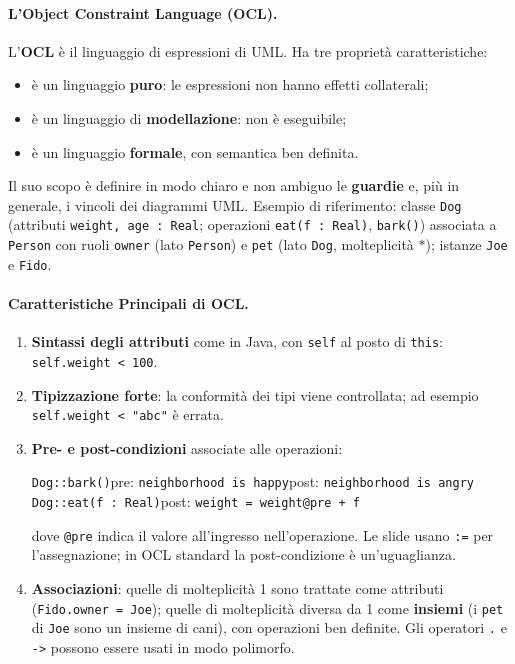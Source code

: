 \documentclass[12pt]{extarticle}
\begin{document}
\paragraph{L'Object Constraint Language (OCL).}
L'\textbf{OCL} è il linguaggio di espressioni di UML. Ha tre proprietà caratteristiche:
\begin{itemize}
    \item è un linguaggio \textbf{puro}: le espressioni non hanno effetti collaterali;
    \item è un linguaggio di \textbf{modellazione}: non è eseguibile;
    \item è un linguaggio \textbf{formale}, con semantica ben definita.
\end{itemize}
Il suo scopo è definire in modo chiaro e non ambiguo le \textbf{guardie} e, più in generale, i vincoli dei diagrammi UML. Esempio di riferimento: classe \texttt{Dog} (attributi \texttt{weight, age : Real}; operazioni \texttt{eat(f : Real)}, \texttt{bark()}) associata a \texttt{Person} con ruoli \texttt{owner} (lato \texttt{Person}) e \texttt{pet} (lato \texttt{Dog}, molteplicità $*$); istanze \texttt{Joe} e \texttt{Fido}.

\paragraph{Caratteristiche Principali di OCL.}
\begin{enumerate}
    \item \textbf{Sintassi degli attributi} come in Java, con \texttt{self} al posto di \texttt{this}: \texttt{self.weight < 100}.
    \item \textbf{Tipizzazione forte}: la conformità dei tipi viene controllata; ad esempio \texttt{self.weight < "abc"} è errata.
    \item \textbf{Pre- e post-condizioni} associate alle operazioni:
    \begin{center}
    \texttt{Dog::bark()}\quad pre: \texttt{neighborhood is happy}\quad post: \texttt{neighborhood is angry}\\[2pt]
    \texttt{Dog::eat(f : Real)}\quad post: \texttt{weight = weight@pre + f}
    \end{center}
    dove \texttt{@pre} indica il valore all'ingresso nell'operazione. Le slide usano \texttt{:=} per l'assegnazione; in OCL standard la post-condizione è un'uguaglianza.
    \item \textbf{Associazioni}: quelle di molteplicità 1 sono trattate come attributi (\texttt{Fido.owner = Joe}); quelle di molteplicità diversa da 1 come \textbf{insiemi} (i \texttt{pet} di \texttt{Joe} sono un insieme di cani), con operazioni ben definite. Gli operatori \texttt{.} e \texttt{->} possono essere usati in modo polimorfo.
\end{enumerate}
\end{document}
